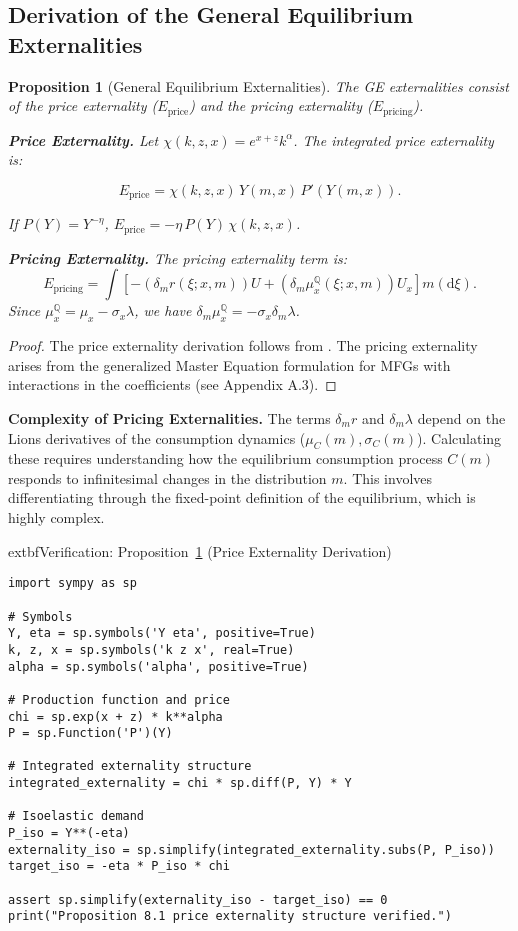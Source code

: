 \documentclass[11pt,letterpaper,oneside]{article}
\newtheorem{propositionT}{Proposition}
\newenvironment{proposition}[2]{\begin{propositionT}[#1]\label{prop:#2}}{\end{propositionT}}
\newcommand{\diff}{\mathrm{d}}
\newcommand{\muxQ}{\mu_x^{\mathbb{Q}}}
\newcommand{\extbf}[1]{\textbf{#1}}
\begin{document}
\subsection{Derivation of the General Equilibrium Externalities}

\begin{proposition}{General Equilibrium Externalities}{externality}
The GE externalities consist of the price externality ($E_{\text{price}}$) and the pricing externality ($E_{\text{pricing}}$).

\textbf{Price Externality.} Let $\chi(k,z,x)=e^{x+z}k^\alpha$. The integrated price externality is:

$$
E_{\text{price}} = \chi(k,z,x)\,Y(m,x)\,P'(Y(m,x)).
$$

If $P(Y)=Y^{-\eta}$, $E_{\text{price}} = -\eta\,P(Y)\,\chi(k,z,x)$.

\textbf{Pricing Externality.} The pricing externality term is:
$$
E_{\text{pricing}} = \int \left[ -(\delta_m r(\xi;x,m)) U + (\delta_m \muxQ(\xi;x,m)) U_x \right] m(\diff \xi).
$$
Since $\muxQ = \mu_x - \sigma_x \lambda$, we have $\delta_m \muxQ = -\sigma_x \delta_m \lambda$.
\end{proposition}

\begin{proof}
The price externality derivation follows from . The pricing externality arises from the generalized Master Equation formulation for MFGs with interactions in the coefficients (see Appendix A.3).
\end{proof}

\begin{tcolorbox}[mathstyle]
  \extbf{Complexity of Pricing Externalities.} The terms $\delta_m r$ and $\delta_m \lambda$ depend on the Lions derivatives of the consumption dynamics ($\mu_C(m), \sigma_C(m)$). Calculating these requires understanding how the equilibrium consumption process $C(m)$ responds to infinitesimal changes in the distribution $m$. This involves differentiating through the fixed-point definition of the equilibrium, which is highly complex.
\end{tcolorbox}


\begin{tcolorbox}[sympycheckstyle]
  extbf{Verification: Proposition~\ref{prop:externality} (Price Externality Derivation)}
\begin{verbatim}
import sympy as sp

# Symbols
Y, eta = sp.symbols('Y eta', positive=True)
k, z, x = sp.symbols('k z x', real=True)
alpha = sp.symbols('alpha', positive=True)

# Production function and price
chi = sp.exp(x + z) * k**alpha
P = sp.Function('P')(Y)

# Integrated externality structure
integrated_externality = chi * sp.diff(P, Y) * Y

# Isoelastic demand
P_iso = Y**(-eta)
externality_iso = sp.simplify(integrated_externality.subs(P, P_iso))
target_iso = -eta * P_iso * chi

assert sp.simplify(externality_iso - target_iso) == 0
print("Proposition 8.1 price externality structure verified.")
\end{verbatim}
\end{tcolorbox}
\end{document}

